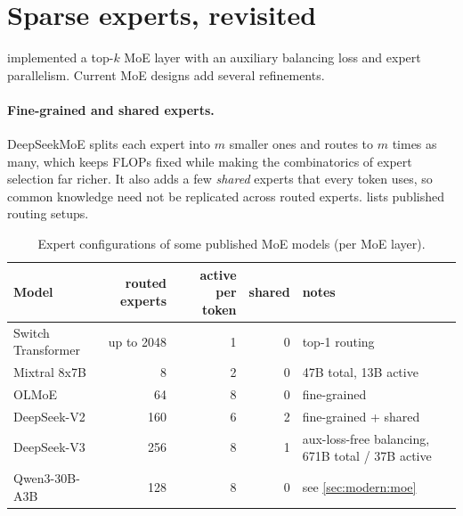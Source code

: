 \section{Sparse experts, revisited}\label{sec:attnalt:moe}

 implemented a top-$k$ MoE layer with an auxiliary balancing loss and expert
parallelism. Current MoE designs add several refinements.

\paragraph{Fine-grained and shared experts.} DeepSeekMoE splits each expert into $m$ smaller ones and routes to
$m$ times as many, which keeps FLOPs fixed while making the combinatorics of expert selection far richer.
It also adds a few \emph{shared} experts that every token uses, so common knowledge need not be replicated
across routed experts.  lists published routing setups.

\begin{table}[t]
\centering\small
\begin{tabular}{@{}lrrrl@{}}
\toprule
Model & routed experts & active per token & shared & notes\\
\midrule
Switch Transformer & up to 2048 & 1 & 0 & top-1 routing\\
Mixtral 8x7B & 8 & 2 & 0 & 47B total, 13B active\\
OLMoE & 64 & 8 & 0 & fine-grained\\
DeepSeek-V2 & 160 & 6 & 2 & fine-grained + shared\\
DeepSeek-V3 & 256 & 8 & 1 & aux-loss-free balancing, 671B total / 37B active\\
Qwen3-30B-A3B & 128 & 8 & 0 & see \cref{sec:modern:moe}\\
\bottomrule
\end{tabular}
\caption{Expert configurations of some published MoE models (per MoE layer).}
\label{tab:attnalt:moe}
\end{table}


